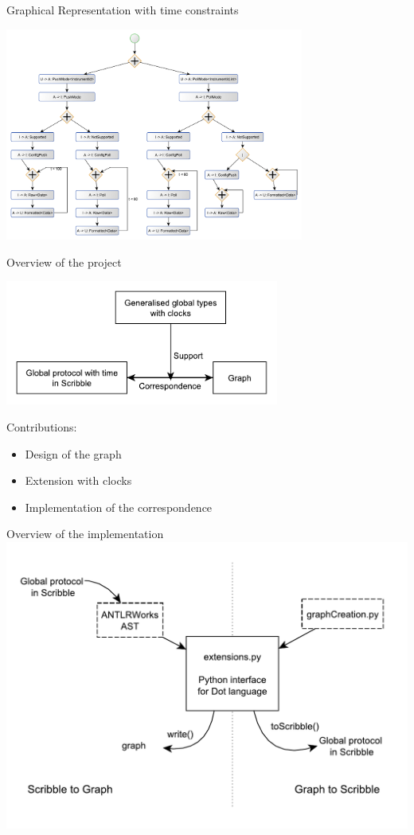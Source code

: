\documentclass[8 pt]{beamer}
\begin{document}
\begin{frame}{Graphical Representation with time constraints}
\begin{center}
\includegraphics[height=7cm]{ooi_graph2}
\end{center}
\end{frame}

\begin{frame}{Overview of the project}
\begin{center}
\includegraphics[width=9cm]{architecture3}
\end{center}
\pause
Contributions:
\begin{itemize}
\item<2-> Design of the graph
\item<2-> Extension with clocks
\item<2-> Implementation of the correspondence
\end{itemize}
\end{frame}

\begin{frame}{Overview of the implementation}
\includegraphics[scale=0.6]{structure}
\end{frame}
\end{document}
